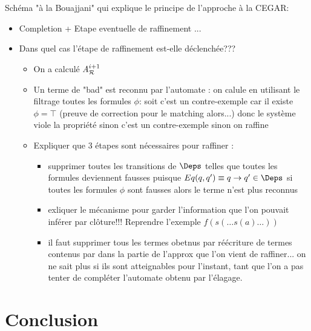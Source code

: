 \documentclass{fsttcs}
\begin{document}
Schéma "à la Bouajjani" qui explique le principe de l'approche à la CEGAR:
\begin{itemize}
\item Completion + Etape eventuelle de raffinement ...

\item Dans quel cas l'étape de raffinement est-elle déclenchée???

  \begin{itemize}
  \item On a calculé ${\it A}_{\mathcal R}^{i+1}$
  \item Un terme de "bad" est reconnu par l'automate : on calule en utilisant le filtrage
    toutes les formules $\phi$:
    soit c'est un contre-exemple car il existe $\phi = \top$ (preuve de correction pour le matching alors...)
    donc le système viole la propriété sinon c'est un contre-exemple 
    sinon on raffine
  \item Expliquer que 3 étapes sont nécessaires pour raffiner :
    \begin{itemize}
    \item 
      supprimer toutes les transitions de $\Deps$ telles que
      toutes les formules deviennent fausses puisque $Eq(q, q') \equiv q \rw q' \in \Deps$
      si toutes les formules $\phi$ sont fausses alors le terme n'est plus reconnus
    \item 
      exliquer le mécanisme pour garder l'information que l'on pouvait inférer
      par clôture!!! Reprendre l'exemple $f(s(\dots s(a)\dots ))$
      
    \item
      il faut supprimer tous les termes obetnus par réécriture de termes contenus
      par dans la partie de l'approx que l'on vient de raffiner... 
      on ne sait plus si ils sont atteignables pour l'instant, 
      tant que l'on a pas tenter de compléter l'automate obtenu par l'élagage.
    \end{itemize}
  \end{itemize}
\end{itemize}


\section{Conclusion}
\label{sec:conclusion}


%
\end{document}
